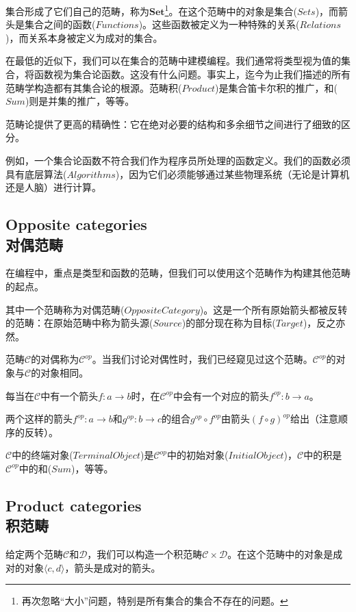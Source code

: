\documentclass[DaoFP]{subfiles}
\begin{document}
    集合形成了它们自己的范畴，称为$\mathbf{Set}$\footnote{再次忽略“大小”问题，特别是所有集合的集合不存在的问题。}。在这个范畴中的对象是集合($Sets$)，而箭头是集合之间的函数($Functions$)。这些函数被定义为一种特殊的关系($Relations$)，而关系本身被定义为成对的集合。

    在最低的近似下，我们可以在集合的范畴中建模编程。我们通常将类型视为值的集合，将函数视为集合论函数。这没有什么问题。事实上，迄今为止我们描述的所有范畴学构造都有其集合论的根源。范畴积($Product$)是集合笛卡尔积的推广，和($Sum$)则是并集的推广，等等。

    范畴论提供了更高的精确性：它在绝对必要的结构和多余细节之间进行了细致的区分。

    例如，一个集合论函数不符合我们作为程序员所处理的函数定义。我们的函数必须具有底层算法($Algorithms$)，因为它们必须能够通过某些物理系统（无论是计算机还是人脑）进行计算。

    \subsection{Opposite categories\\对偶范畴}

    在编程中，重点是类型和函数的范畴，但我们可以使用这个范畴作为构建其他范畴的起点。

    其中一个范畴称为对偶范畴($Opposite Category$)。这是一个所有原始箭头都被反转的范畴：在原始范畴中称为箭头源($Source$)的部分现在称为目标($Target$)，反之亦然。

    范畴$\mathcal{C}$的对偶称为$\mathcal{C}^{op}$。当我们讨论对偶性时，我们已经窥见过这个范畴。$\mathcal{C}^{op}$的对象与$\mathcal{C}$的对象相同。

    每当在$\mathcal{C}$中有一个箭头$f \colon a \to b$时，在$\mathcal{C}^{op}$中会有一个对应的箭头$f^{op} \colon b \to a$。

    两个这样的箭头$f^{op} \colon a \to b$和$g^{op} \colon b \to c$的组合$g^{op} \circ f^{op}$由箭头$(f \circ g)^{op}$给出（注意顺序的反转）。

    $\mathcal{C}$中的终端对象($Terminal Object$)是$\mathcal{C}^{op}$中的初始对象($Initial Object$)，$\mathcal{C}$中的积是$\mathcal{C}^{op}$中的和($Sum$)，等等。

    \subsection{Product categories\\积范畴}

    给定两个范畴$\mathcal{C}$和$\mathcal{D}$，我们可以构造一个积范畴$\mathcal{C} \times \mathcal{D}$。在这个范畴中的对象是成对的对象$\langle c, d \rangle $，箭头是成对的箭头。
\end{document}
